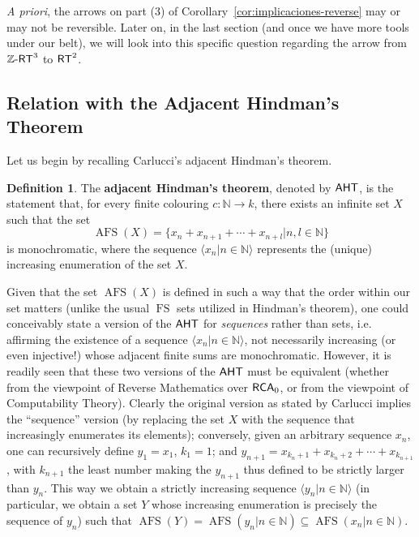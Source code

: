 \documentclass[10pt,a4paper]{amsart}
\newcommand{\rt}{\mathnormal{\mathsf{RT}}}
\newcommand{\zrt}{\mathnormal{\mathbb Z\text{-}\mathsf{RT}}}
\newcommand{\aht}{\mathnormal{\mathsf{AHT}}}
\newcommand{\rca}{\mathnormal{\mathsf{RCA}}_0}
\DeclareMathOperator{\afs}{AFS}
\DeclareMathOperator{\fs}{FS}
\theoremstyle{definition}
\newtheorem{definition}[theorem]{Definition}
\begin{document}
{\it A priori}, the arrows on part (3) of Corollary~\ref{cor:implicaciones-reverse} may or may not be reversible. Later on, in the last section (and once we have more tools under our belt), we will look into this specific question regarding the arrow from $\zrt^3$ to $\rt^2$.

\subsection{Relation with the Adjacent Hindman's Theorem}

Let us begin by recalling Carlucci's adjacent Hindman's theorem.

\begin{definition}
The {\bf adjacent Hindman's theorem}, denoted by $\aht$, is the statement that, for every finite colouring $c:\mathbb N\longrightarrow k$, there exists an infinite set $X$ such that the set
\begin{equation*}
\afs(X)=\{x_n+x_{n+1}+\cdots+x_{n+l}\big|n,l\in\mathbb N\}
\end{equation*}
is monochromatic, where the sequence $\langle x_n\big|n\in\mathbb N\rangle$ represents the (unique) increasing enumeration of the set $X$.
\end{definition}

Given that the set $\afs(X)$ is defined in such a way that the order within our set matters (unlike the usual $\fs$ sets utilized in Hindman's theorem), one could conceivably state a version of the $\aht$ for {\it sequences} rather than sets, i.e. affirming the existence of a sequence $\langle x_n\big|n\in\mathbb N\rangle$, not necessarily increasing (or even injective!) whose adjacent finite sums are monochromatic. However, it is readily seen that these two versions of the $\aht$ must be equivalent (whether from the viewpoint of Reverse Mathematics over $\rca$, or from the viewpoint of Computability Theory). Clearly the original version as stated by Carlucci implies the ``sequence'' version (by replacing the set $X$ with the sequence that increasingly enumerates its elements); conversely, given an arbitrary sequence $x_n$, one can recursively define $y_1=x_1$, $k_1=1$; and $y_{n+1}=x_{k_n+1}+x_{k_n+2}+\cdots+x_{k_{n+1}}$, with $k_{n+1}$ the least number making the $y_{n+1}$ thus defined to be strictly larger than $y_n$. This way we obtain a strictly increasing sequence $\langle y_n\big|n\in\mathbb N\rangle$ (in particular, we obtain a set $Y$ whose increasing enumeration is precisely the sequence of $y_n$) such that $\afs(Y)=\afs(y_n\big|n\in\mathbb N)\subseteq\afs(x_n\big|n\in\mathbb N)$.
\end{document}
